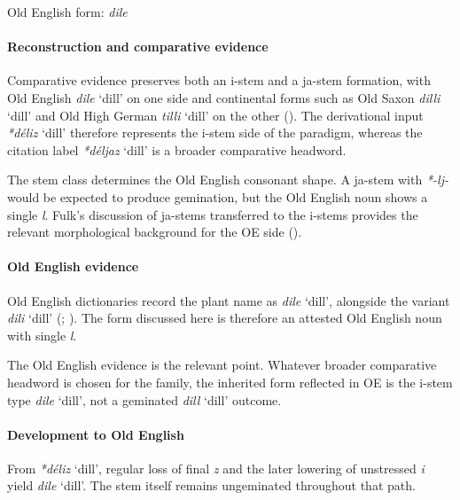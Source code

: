 \documentclass[
  british,
  a4paper,
]{article}
\providecommand{\Recon}[1]{\emph{*#1}}
\begin{document}
Old English form: \emph{dile}

\paragraph{Reconstruction and comparative
evidence}\label{reconstruction-and-comparative-evidence-86}

Comparative evidence preserves both an i-stem and a ja-stem formation,
with Old English {\emph{dile}} `dill' on one side and continental forms
such as Old Saxon {\emph{dilli}} `dill' and Old High German
{\emph{tilli}} `dill' on the other (). The derivational input \Recon{déliz} `dill' therefore represents
the i-stem side of the paradigm, whereas the citation label
\Recon{déljaz} `dill' is a broader comparative headword.

The stem class determines the Old English consonant shape. A ja-stem
with \emph{*-lj-} would be expected to produce gemination, but the Old
English noun shows a single \emph{l}. Fulk's discussion of ja-stems
transferred to the i-stems provides the relevant morphological
background for the OE side ().

\paragraph{Old English evidence}\label{old-english-evidence-86}

Old English dictionaries record the plant name as {\emph{dile}} `dill',
alongside the variant {\emph{dili}} `dill'
(;
). The form discussed
here is therefore an attested Old English noun with single \emph{l}.

The Old English evidence is the relevant point. Whatever broader
comparative headword is chosen for the family, the inherited form
reflected in OE is the i-stem type {\emph{dile}} `dill', not a geminated
{\emph{dill}} `dill' outcome.

\paragraph{Development to Old
English}\label{development-to-old-english-86}

From \Recon{déliz} `dill', regular loss of final \emph{z} and the later
lowering of unstressed \emph{i} yield {\emph{dile}} `dill'. The stem
itself remains ungeminated throughout that path.
\end{document}
